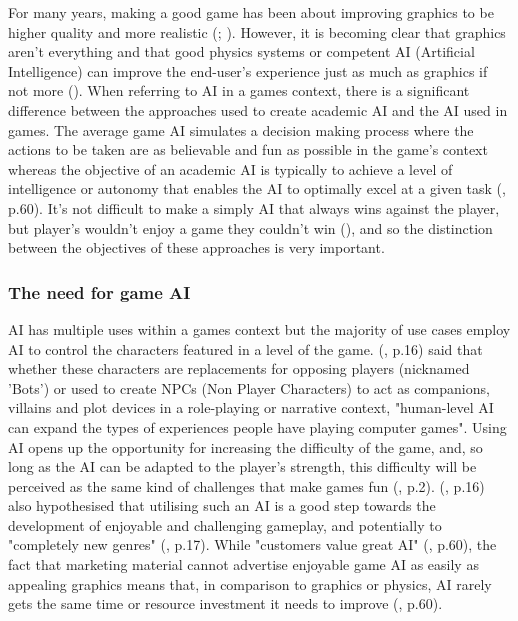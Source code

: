 \documentclass[10pt]{article}
\begin{document}
For many years, making a good game has been about improving graphics to be higher quality and more realistic (\cite{yap2002grid}; \cite{blow2004game}). However, it is becoming clear that graphics aren't everything and that good physics systems or competent AI (Artificial Intelligence) can improve the end-user's experience just as much as graphics if not more (\cite{blow2004game}). When referring to AI in a games context, there is a significant difference between the approaches used to create academic AI and the AI used in games. The average game AI simulates a decision making process where the actions to be taken are as believable and fun as possible in the game's context whereas the objective of an academic AI is typically to achieve a level of intelligence or autonomy that enables the AI to optimally excel at a given task (\cite{nareyek2004ai}, p.60). It's not difficult to make a simply AI that always wins against the player, but player's wouldn't enjoy a game they couldn't win (\cite{tozour2002evolution}), and so the distinction between the objectives of these approaches is very important.

\subsubsection{The need for game AI}

AI has multiple uses within a games context but the majority of use cases employ AI to control the characters featured in a level of the game. \citeauthor{laird2001human} (\citeyear{laird2001human}, p.16) said that whether these characters are replacements for opposing players (nicknamed 'Bots') or used to create NPCs (Non Player Characters) to act as companions, villains and plot devices in a role-playing or narrative context, "human-level AI can expand the types of experiences people have playing computer games". Using AI opens up the opportunity for increasing the difficulty of the game, and, so long as the AI can be adapted to the player's strength, this difficulty will be perceived as the same kind of challenges that make games fun (\cite{buro2004call}, p.2). \citeauthor{laird2001human} (\citeyear{laird2001human}, p.16) also hypothesised that utilising such an AI is a good step towards the development of enjoyable and challenging gameplay, and potentially to "completely new genres" (\cite{laird2001human}, p.17). While "customers value great AI" (\cite{nareyek2004ai}, p.60), the fact that marketing material cannot advertise enjoyable game AI as easily as appealing graphics means that, in comparison to graphics or physics, AI rarely gets the same time or resource investment it needs to improve (\cite{nareyek2004ai}, p.60).
\end{document}
